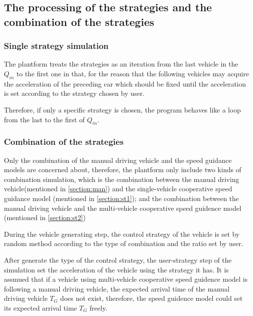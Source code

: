 \documentclass[a4paper,UTF8]{paper}
\begin{document}
\subsection{The processing of the strategies and the combination of the strategies}
\subsubsection{Single strategy simulation}
The plantform treats the strategies as an iteration from the last vehicle in the $Q_{in}$ to the first one in that, for the reason that the following vehicles may acquire the acceleration of the preceding car which should be fixed until the acceleration is set according to the strategy chosen by user. 

Therefore, if only a specific strategy is chosen, the program behaves like a loop from the last to the first of $Q_{in}$.

\subsubsection{Combination of the strategies}
Only the combination of the manual driving vehicle and the speed guidance models are concerned about, therefore, the plantform only include two kinds of combination simulation, which is the combination between the manual driving vehicle(mentioned in \ref{section:man}) and the single-vehicle cooperative speed guidance model (mentioned in \ref{section:st1}); and the combination between the manual driving vehicle and the multi-vehicle cooperative speed guidence model (mentioned in \ref{section:st2})

During the vehicle generating step, the control strategy of the vehicle is set by random method according to the type of combination and the ratio set by user.

After generate the type of the control strategy, the user-strategy step of the simulation set the acceleration of the vehicle using the strategy it has. It is assmued that if a vehicle using multi-vehicle cooperative speed guidence model is following a manual driving vehicle, the expected arrival time of the manual driving vehicle $T_G$ does not exist, therefore, the speed guidence model could set its expected arrival time $T_G$ freely.
\end{document}
